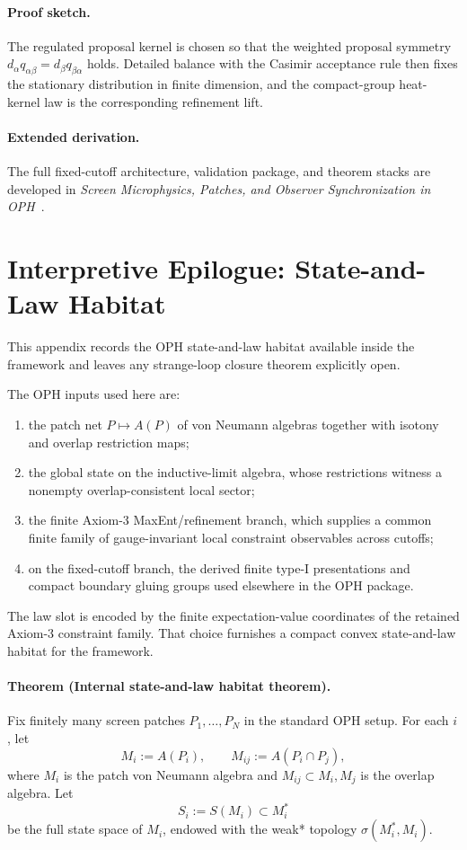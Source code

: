 \paragraph{Proof sketch.}
The regulated proposal kernel is chosen so that the weighted proposal symmetry
\(d_\alpha q_{\alpha\beta}=d_\beta q_{\beta\alpha}\) holds. Detailed balance with the Casimir
acceptance rule then fixes the stationary distribution in finite dimension, and the compact-group
heat-kernel law is the corresponding refinement lift.

\paragraph{Extended derivation.}
The full fixed-cutoff architecture, validation package, and theorem stacks are developed in
\emph{Screen Microphysics, Patches, and Observer Synchronization in OPH}~\cite{ophmicrophysics}.

\section{Interpretive Epilogue: State-and-Law Habitat}

This appendix records the OPH state-and-law habitat available inside the
framework and leaves any strange-loop closure theorem explicitly open.

The OPH inputs used here are:
\begin{enumerate}
\item the patch net \(P\mapsto A(P)\) of von Neumann algebras together with isotony and overlap
restriction maps;
\item the global state on the inductive-limit algebra, whose restrictions witness a nonempty
overlap-consistent local sector;
\item the finite Axiom-3 MaxEnt/refinement branch, which supplies a common finite family of
gauge-invariant local constraint observables across cutoffs;
\item on the fixed-cutoff branch, the derived finite type-I presentations and compact boundary
gluing groups used elsewhere in the OPH package.
\end{enumerate}

The law slot is encoded by the finite expectation-value coordinates of the retained Axiom-3
constraint family. That choice furnishes a compact convex state-and-law habitat for the framework.

\paragraph{Theorem (Internal state-and-law habitat theorem).}
Fix finitely many screen patches \(P_1,\dots,P_N\) in the standard OPH setup. For each \(i\), let
\[
M_i:=A(P_i),
\qquad
M_{ij}:=A(P_i\cap P_j),
\]
where \(M_i\) is the patch von Neumann algebra and \(M_{ij}\subset M_i,M_j\) is the overlap
algebra. Let
\[
S_i:=S(M_i)\subset M_i^*
\]
be the full state space of \(M_i\), endowed with the weak* topology \(\sigma(M_i^*,M_i)\).

